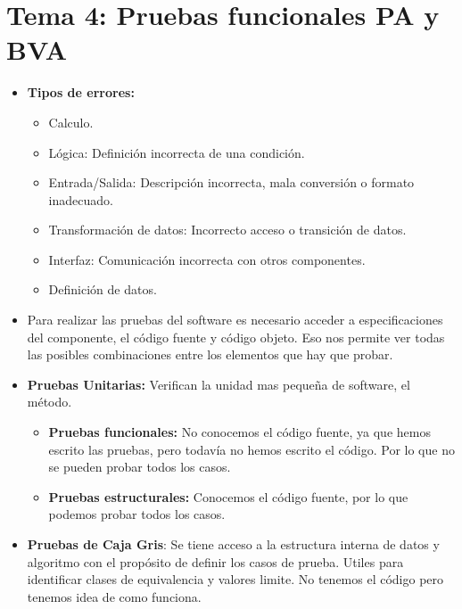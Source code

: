 \documentclass[12pt, twoside, openright]{report} %
\begin{document}
\chapter{Tema 4: Pruebas funcionales PA y BVA}

\begin{itemize}
\item \textbf{Tipos de errores:}
  

  \begin{itemize}
  \item Calculo.
    
  \item Lógica: Definición incorrecta de una condición.
    
  \item Entrada/Salida: Descripción incorrecta, mala conversión o formato
    inadecuado.
    
  \item Transformación de datos: Incorrecto acceso o transición de datos.
    
  \item Interfaz: Comunicación incorrecta con otros componentes.
    
  \item Definición de datos.
    
  \end{itemize}
\item Para realizar las pruebas del software es necesario acceder a
  especificaciones del componente, el código fuente y código objeto. Eso
  nos permite ver todas las posibles combinaciones entre los elementos
  que hay que probar.
  
\item \textbf{Pruebas Unitarias:} Verifican la unidad mas pequeña de
  software, el método.
  

  \begin{itemize}
  \item \textbf{Pruebas funcionales:} No conocemos el código fuente, ya que
    hemos escrito las pruebas, pero todavía no hemos escrito el código.
    Por lo que no se pueden probar todos los casos.
    
  \item \textbf{Pruebas estructurales:} Conocemos el código fuente, por lo
    que podemos probar todos los casos.
    
  \end{itemize}
\item \textbf{Pruebas de Caja Gris}: Se tiene acceso a la estructura interna
  de datos y algoritmo con el propósito de definir los casos de prueba.
  Utiles para identificar clases de equivalencia y valores limite. No
  tenemos el código pero tenemos idea de como funciona.
  

\end{itemize}
\end{document}
